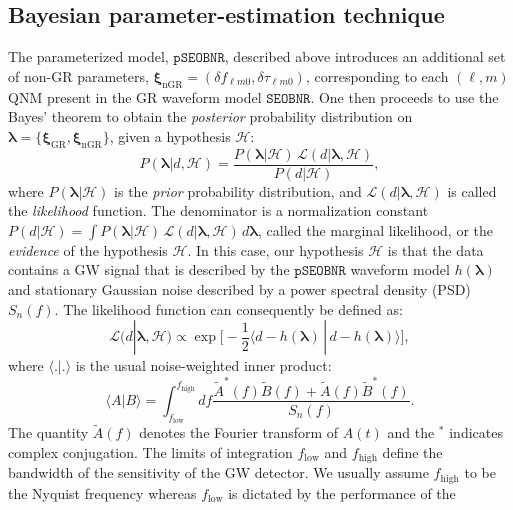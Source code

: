 \documentclass[twocolumn,prd,aps,superscriptaddress,preprintnumbers,tightenlines,showpacs,nofootinbib,eqsecnum,amsfonts,amsmath]{revtex4-1}
\newcommand{\blambda}{\bm{\lambda}}
\newcommand{\bxigr}{\bm{\xi}_{\text{GR}}}
\newcommand{\bxingr}{\bm{\xi}_{\text{nGR}}}
\newcommand{\pSEOB}{\texttt{pSEOBNR}}
\newcommand{\SEOB}{\texttt{SEOBNR}}
\begin{document}
\subsection{Bayesian parameter-estimation technique}
\label{sec:method}

The parameterized model, $\pSEOB$, described above introduces an additional set of non-GR parameters, $\bxingr = (\delta f_{\ell m 0},\delta \tau_{\ell m 0})$, corresponding to each $(\ell,m)$ QNM present in the GR waveform model $\SEOB$. One then proceeds to use the Bayes' theorem to obtain the \emph{posterior} probability distribution on $\blambda = \{\bxigr, \bxingr\}$, given a hypothesis $\mathcal{H}$:
%
\begin{equation}
P(\blambda | d, \mathcal{H}) = \frac{P(\blambda | \mathcal{H}) \, \mathcal{L}(d | \blambda, \mathcal{H})}{P(d|\mathcal{H})},
\label{eq:Bayes_theorem}
\end{equation}
%
where $P(\blambda | \mathcal{H})$ is the \emph{prior} probability distribution, and $\mathcal{L}(d | \blambda, \mathcal{H})$ is called the \emph{likelihood} function. The denominator is a normalization constant $P(d|\mathcal{H}) = \int P(\blambda | \mathcal{H}) \, \mathcal{L}(d | \blambda, \mathcal{H}) \, d\blambda$, called the marginal likelihood, or the \emph{evidence} of the hypothesis $\mathcal{H}$. In this case, our hypothesis $\mathcal{H}$ is that the data contains a GW signal that is described by the $\pSEOB$ waveform model $h(\blambda)$  and stationary Gaussian noise described by a power spectral density (PSD) $S_n(f)$. The likelihood function can consequently be defined as:
%
\begin{equation}
\mathcal{L}(d | \blambda, \mathcal{H}) \propto \exp\big[-\frac{1}{2} \langle d - h(\blambda) \, | \, d -h(\blambda) \rangle \big],
\label{eq:likelihood}
\end{equation}
%
where $\langle . | . \rangle$ is the usual noise-weighted inner product:
%
\begin{equation}
\langle A | B \rangle = \int_{f_\mathrm{low}} ^{f_\mathrm{high}} df \frac{\tilde{A}^*(f)\tilde{B}(f) + \tilde{A}(f)\tilde{B}^*(f)}{S_n(f)}.
\label{eq:nwip}
\end{equation}
%
The quantity $\tilde{A}(f)$ denotes the Fourier transform of $A(t)$ and the $^*$ indicates complex conjugation. The limits of integration ${f_\mathrm{low}}$ and ${f_\mathrm{high}}$ define the bandwidth of the sensitivity of the GW detector. We usually assume ${f_\mathrm{high}}$ to be the Nyquist frequency whereas ${f_\mathrm{low}}$ is dictated by the performance of the
\end{document}
